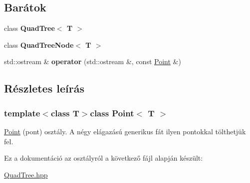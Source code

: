 \subsection*{Barátok}
\begin{DoxyCompactItemize}
\item 
\hypertarget{class_point_a86cf92e1bfbee775eead8ccd7dbdc1f8}{class {\bfseries Quad\-Tree$<$ T $>$}}\label{class_point_a86cf92e1bfbee775eead8ccd7dbdc1f8}

\item 
\hypertarget{class_point_ac17a5caf43217c772028859f0dd9036e}{class {\bfseries Quad\-Tree\-Node$<$ T $>$}}\label{class_point_ac17a5caf43217c772028859f0dd9036e}

\item 
\hypertarget{class_point_a7ac667276b1cffd66906f337de0b9fba}{std\-::ostream \& {\bfseries operator} (std\-::ostream \&, const \hyperlink{class_point}{Point} \&)}\label{class_point_a7ac667276b1cffd66906f337de0b9fba}

\end{DoxyCompactItemize}


\subsection{Részletes leírás}
\subsubsection*{template$<$class T$>$class Point$<$ T $>$}

\hyperlink{class_point}{Point} (pont) osztály. A négy elágazású generikus fát ilyen pontokkal tölthetjük fel. 

Ez a dokumentáció az osztályról a következő fájl alapján készült\-:\begin{DoxyCompactItemize}
\item 
\hyperlink{_quad_tree_8hpp}{Quad\-Tree.\-hpp}\end{DoxyCompactItemize}
